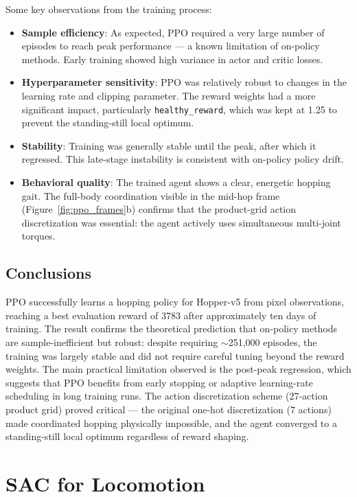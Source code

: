 \documentclass[onecolumn]{cwpreport} %
\begin{document}
Some key observations from the training process:
\begin{itemize}
    \item \textbf{Sample efficiency}: As expected, PPO required a very large number of episodes to reach peak performance — a known limitation of on-policy methods. Early training showed high variance in actor and critic losses.
    \item \textbf{Hyperparameter sensitivity}: PPO was relatively robust to changes in the learning rate and clipping parameter. The reward weights had a more significant impact, particularly \texttt{healthy\_reward}, which was kept at 1.25 to prevent the standing-still local optimum.
    \item \textbf{Stability}: Training was generally stable until the peak, after which it regressed. This late-stage instability is consistent with on-policy policy drift.
    \item \textbf{Behavioral quality}: The trained agent shows a clear, energetic hopping gait. The full-body coordination visible in the mid-hop frame (Figure~\ref{fig:ppo_frames}b) confirms that the product-grid action discretization was essential: the agent actively uses simultaneous multi-joint torques.
\end{itemize}

\subsection{Conclusions}

PPO successfully learns a hopping policy for Hopper-v5 from pixel observations, reaching a best evaluation reward of 3783 after approximately ten days of training. The result confirms the theoretical prediction that on-policy methods are sample-inefficient but robust: despite requiring $\sim$251{,}000 episodes, the training was largely stable and did not require careful tuning beyond the reward weights. The main practical limitation observed is the post-peak regression, which suggests that PPO benefits from early stopping or adaptive learning-rate scheduling in long training runs. The action discretization scheme (27-action product grid) proved critical — the original one-hot discretization (7 actions) made coordinated hopping physically impossible, and the agent converged to a standing-still local optimum regardless of reward shaping.

\section{SAC for Locomotion}
\label{sec:sac}
\end{document}
